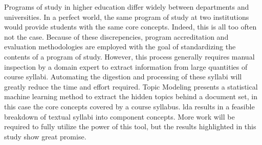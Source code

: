Programs of study in higher education differ widely between departments and
universities. In a perfect world, the same program of study at two
institutions would provide students with the same core concepts. Indeed,
this is all too often not the case. Because of these discrepencies, program
accreditation and evaluation methodologies are employed with the goal of
standardizing the contents of a program of study. However, this process
generally requires manual inspection by a domain expert to extract
information from large quantities of course syllabi. Automating the
digestion and processing of these syllabi will greatly reduce the time and
effort required. Topic Modeling presents a statistical machine learning
method to extract the hidden topics behind a document set, in this case the
core concepts covered by a course syllabus. \acf{lda} results in a feasible
breakdown of textual syllabi into component concepts. More work will be
required to fully utilize the power of this tool, but the results
highlighted in this study show great promise.
